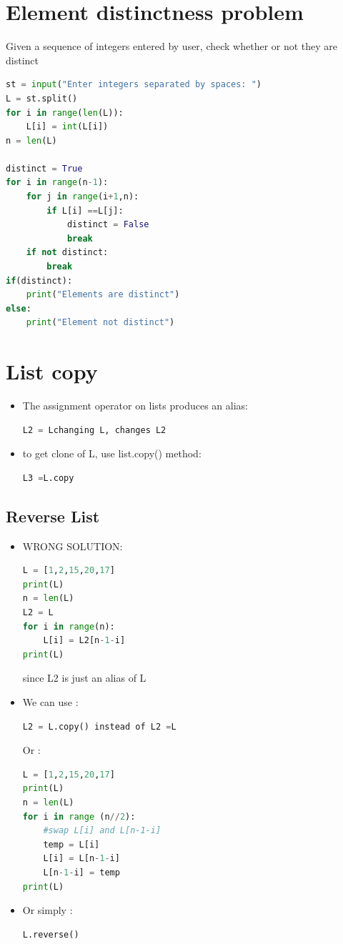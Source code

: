 \documentclass[12pt,oneside]{book}
\begin{document}
\section{Element distinctness problem}
Given a sequence of integers entered by user, check whether or not they are distinct
\begin{lstlisting}[language=python]
st = input("Enter integers separated by spaces: ")
L = st.split()
for i in range(len(L)):
	L[i] = int(L[i])
n = len(L)

distinct = True 
for i in range(n-1):
	for j in range(i+1,n):
		if L[i] ==L[j]:
			distinct = False 
			break 
	if not distinct: 
		break 
if(distinct):
	print("Elements are distinct")
else:
	print("Element not distinct")
\end{lstlisting}
\section{List copy}
\begin{itemize}
	\item The assignment operator on lists produces an alias:
\begin{lstlisting}[language=python]
L2 = Lchanging L, changes L2
\end{lstlisting}
	\item to get clone of L, use list.copy() method:
\begin{lstlisting}[language=python]
L3 =L.copy
\end{lstlisting}
\end{itemize}
\subsection{Reverse List}
\begin{itemize}
	\item WRONG SOLUTION:
	\begin{lstlisting}[language=python]
L = [1,2,15,20,17]
print(L)
n = len(L)
L2 = L
for i in range(n):
	L[i] = L2[n-1-i]
print(L)
	\end{lstlisting}
	since L2 is just an alias of L
	\item  We can use :
	\begin{lstlisting}[language=python]
L2 = L.copy() instead of L2 =L
\end{lstlisting}
Or :
\begin{lstlisting}[language=python]
L = [1,2,15,20,17]
print(L)
n = len(L)
for i in range (n//2):
	#swap L[i] and L[n-1-i]
	temp = L[i]
	L[i] = L[n-1-i]
	L[n-1-i] = temp 
print(L)
	\end{lstlisting}
	\item Or simply :
\begin{lstlisting}[language=python]
L.reverse()
\end{lstlisting}
\end{itemize}
\end{document}
